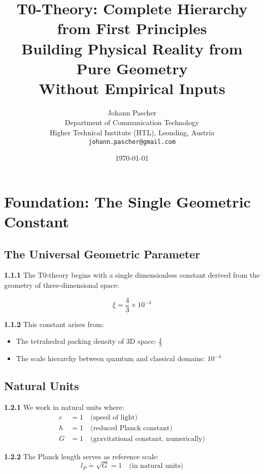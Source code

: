\documentclass[12pt,a4paper]{article}
\title{\textbf{T0-Theory: Complete Hierarchy from First Principles}\\[0.5cm]
	\large Building Physical Reality from Pure Geometry\\[0.3cm]
	\normalsize Without Empirical Inputs}
\author{Johann Pascher\\
	Department of Communication Technology\\
	Higher Technical Institute (HTL), Leonding, Austria\\
	\texttt{johann.pascher@gmail.com}}
\date{\today}
\newcommand{\lP}{l_P}
\newcommand{\xipar}{\xi}
\begin{document}
	\maketitle
	\tableofcontents
	\newpage
	
	\section{Foundation: The Single Geometric Constant}
	
	\subsection{The Universal Geometric Parameter}
	
	\noindent \textbf{1.1.1} The T0-theory begins with a single dimensionless constant derived from the geometry of three-dimensional space:
	
	\begin{keyresult}
		\begin{equation}
			\boxed{\xipar = \frac{4}{3} \times 10^{-4}}
		\end{equation}
	\end{keyresult}
	
	\noindent \textbf{1.1.2} This constant arises from:
	\begin{itemize}
		\item The tetrahedral packing density of 3D space: $\frac{4}{3}$
		\item The scale hierarchy between quantum and classical domains: $10^{-4}$
	\end{itemize}
	
	\subsection{Natural Units}
	
	\noindent \textbf{1.2.1} We work in natural units where:
	\begin{align}
		c &= 1 \quad \text{(speed of light)} \\
		\hbar &= 1 \quad \text{(reduced Planck constant)} \\
		G &= 1 \quad \text{(gravitational constant, numerically)}
	\end{align}
	
	\noindent \textbf{1.2.2} The Planck length serves as reference scale:
	\begin{equation}
		\lP = \sqrt{G} = 1 \quad \text{(in natural units)}
	\end{equation}
	
\end{document}

